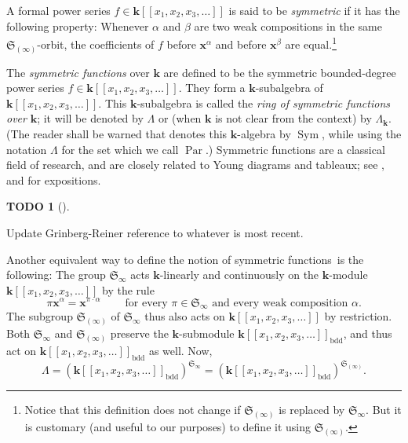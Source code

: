\documentclass[numbers=enddot,12pt,final,onecolumn,notitlepage]{scrartcl}%
\theoremstyle{definition}
\newtheorem{quest}[theo]{TODO}
\newenvironment{todo}[1][]
{\begin{quest}[#1]\begin{leftbar}}
{\end{leftbar}\end{quest}}
\begin{document}
A formal power series $f\in\mathbf{k}\left[  \left[  x_{1},x_{2},x_{3}%
,\ldots\right]  \right]  $ is said to be \textit{symmetric} if it has the
following property: Whenever $\alpha$ and $\beta$ are two weak compositions in
the same $\mathfrak{S}_{\left(  \infty\right)  }$-orbit, the coefficients of
$f$ before $\mathbf{x}^{\alpha}$ and before $\mathbf{x}^{\beta}$ are
equal.\footnote{Notice that this definition does not change if $\mathfrak{S}%
_{\left(  \infty\right)  }$ is replaced by $\mathfrak{S}_{\infty}$. But it is
customary (and useful to our purposes) to define it using $\mathfrak{S}%
_{\left(  \infty\right)  }$.}

The \textit{symmetric functions} over $\mathbf{k}$ are defined to be the
symmetric bounded-degree power series $f\in\mathbf{k}\left[  \left[
x_{1},x_{2},x_{3},\ldots\right]  \right]  $. They form a $\mathbf{k}%
$-subalgebra of $\mathbf{k}\left[  \left[  x_{1},x_{2},x_{3},\ldots\right]
\right]  $. This $\mathbf{k}$-subalgebra is called the \textit{ring of
symmetric functions over }$\mathbf{k}$; it will be denoted by $\Lambda$ or
(when $\mathbf{k}$ is not clear from the context) by $\Lambda_{\mathbf{k}}$.
(The reader shall be warned that \cite{LamPyl} denotes this $\mathbf{k}%
$-algebra by $\operatorname*{Sym}$, while using the notation $\Lambda$ for the
set which we call $\operatorname*{Par}$.) Symmetric functions are a classical
field of research, and are closely related to Young diagrams and tableaux; see
\cite[Chapter 7]{Stan99}, \cite{Macdon95} and \cite[Chapter 2]{GriRei15} for expositions.

\begin{todo}
Update Grinberg-Reiner reference to whatever is most recent.
\end{todo}

Another equivalent way to define the notion of symmetric functions\ is the
following: The group $\mathfrak{S}_{\infty}$ acts $\mathbf{k}$-linearly and
continuously on the $\mathbf{k}$-module $\mathbf{k}\left[  \left[  x_{1}%
,x_{2},x_{3},\ldots\right]  \right]  $ by the rule%
\[
\pi\mathbf{x}^{\alpha}=\mathbf{x}^{\pi\cdot\alpha}%
\ \ \ \ \ \ \ \ \ \ \text{for every }\pi\in\mathfrak{S}_{\infty}\text{ and
every weak composition }\alpha\text{.}%
\]
The subgroup $\mathfrak{S}_{\left(  \infty\right)  }$ of $\mathfrak{S}%
_{\infty}$ thus also acts on $\mathbf{k}\left[  \left[  x_{1},x_{2}%
,x_{3},\ldots\right]  \right]  $ by restriction. Both $\mathfrak{S}_{\infty}$
and $\mathfrak{S}_{\left(  \infty\right)  }$ preserve the $\mathbf{k}%
$-submodule $\mathbf{k}\left[  \left[  x_{1},x_{2},x_{3},\ldots\right]
\right]  _{\operatorname*{bdd}}$, and thus act on $\mathbf{k}\left[  \left[
x_{1},x_{2},x_{3},\ldots\right]  \right]  _{\operatorname*{bdd}}$ as well.
Now,%
\[
\Lambda=\left(  \mathbf{k}\left[  \left[  x_{1},x_{2},x_{3},\ldots\right]
\right]  _{\operatorname*{bdd}}\right)  ^{\mathfrak{S}_{\infty}}=\left(
\mathbf{k}\left[  \left[  x_{1},x_{2},x_{3},\ldots\right]  \right]
_{\operatorname*{bdd}}\right)  ^{\mathfrak{S}_{\left(  \infty\right)  }}.
\]
\end{document}
